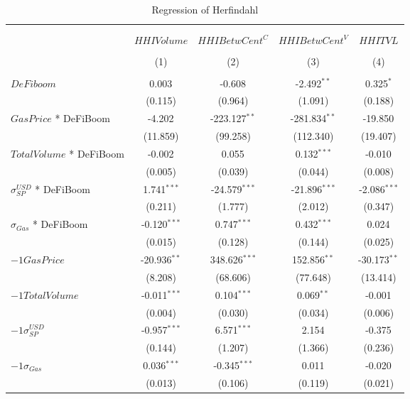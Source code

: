 \begin{table}[!htbp] \centering
  \caption{Regression of Herfindahl}
\begin{tabular}{@{\extracolsep{5pt}}lcccc}
\\[-1.8ex]\hline
\hline \\[-1.8ex]
\\[-1.8ex] & \multicolumn{1}{c}{${	 HHIVolume}$} & \multicolumn{1}{c}{${	 HHIBetwCent}^C$} & \multicolumn{1}{c}{${	 HHIBetwCent}^V$} & \multicolumn{1}{c}{${	 HHITVL}$}  \\
\\[-1.8ex] & (1) & (2) & (3) & (4) \\
\hline \\[-1.8ex]
 ${	 DeFiboom}$ & 0.003$^{}$ & -0.608$^{}$ & -2.492$^{**}$ & 0.325$^{*}$ \\
  & (0.115) & (0.964) & (1.091) & (0.188) \\
 ${	 GasPrice}$ * DeFiBoom & -4.202$^{}$ & -223.127$^{**}$ & -281.834$^{**}$ & -19.850$^{}$ \\
  & (11.859) & (99.258) & (112.340) & (19.407) \\
 ${	 TotalVolume}$ * DeFiBoom & -0.002$^{}$ & 0.055$^{}$ & 0.132$^{***}$ & -0.010$^{}$ \\
  & (0.005) & (0.039) & (0.044) & (0.008) \\
 ${	 \sigma}^{USD}_{SP}$ * DeFiBoom & 1.741$^{***}$ & -24.579$^{***}$ & -21.896$^{***}$ & -2.086$^{***}$ \\
  & (0.211) & (1.777) & (2.012) & (0.347) \\
 ${	 \sigma}_{Gas}$ * DeFiBoom & -0.120$^{***}$ & 0.747$^{***}$ & 0.432$^{***}$ & 0.024$^{}$ \\
  & (0.015) & (0.128) & (0.144) & (0.025) \\
 ${	-1 GasPrice}$ & -20.936$^{**}$ & 348.626$^{***}$ & 152.856$^{**}$ & -30.173$^{**}$ \\
  & (8.208) & (68.606) & (77.648) & (13.414) \\
 ${	-1 TotalVolume}$ & -0.011$^{***}$ & 0.104$^{***}$ & 0.069$^{**}$ & -0.001$^{}$ \\
  & (0.004) & (0.030) & (0.034) & (0.006) \\
 ${	-1 \sigma}^{USD}_{SP}$ & -0.957$^{***}$ & 6.571$^{***}$ & 2.154$^{}$ & -0.375$^{}$ \\
  & (0.144) & (1.207) & (1.366) & (0.236) \\
 ${	-1 \sigma}_{Gas}$ & 0.036$^{***}$ & -0.345$^{***}$ & 0.011$^{}$ & -0.020$^{}$ \\
  & (0.013) & (0.106) & (0.119) & (0.021) \\

\end{tabular}
\end{table}

